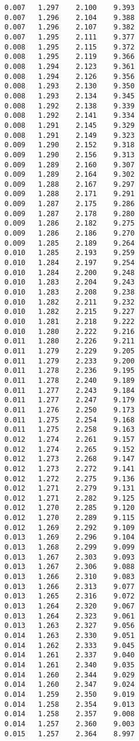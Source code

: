 \begin{verbatim}
   0.007   1.297    2.100    9.393
   0.007   1.296    2.104    9.388
   0.007   1.296    2.107    9.382
   0.007   1.295    2.111    9.377
   0.008   1.295    2.115    9.372
   0.008   1.295    2.119    9.366
   0.008   1.294    2.123    9.361
   0.008   1.294    2.126    9.356
   0.008   1.293    2.130    9.350
   0.008   1.293    2.134    9.345
   0.008   1.292    2.138    9.339
   0.008   1.292    2.141    9.334
   0.008   1.291    2.145    9.329
   0.008   1.291    2.149    9.323
   0.009   1.290    2.152    9.318
   0.009   1.290    2.156    9.313
   0.009   1.289    2.160    9.307
   0.009   1.289    2.164    9.302
   0.009   1.288    2.167    9.297
   0.009   1.288    2.171    9.291
   0.009   1.287    2.175    9.286
   0.009   1.287    2.178    9.280
   0.009   1.286    2.182    9.275
   0.009   1.286    2.186    9.270
   0.009   1.285    2.189    9.264
   0.010   1.285    2.193    9.259
   0.010   1.284    2.197    9.254
   0.010   1.284    2.200    9.248
   0.010   1.283    2.204    9.243
   0.010   1.283    2.208    9.238
   0.010   1.282    2.211    9.232
   0.010   1.282    2.215    9.227
   0.010   1.281    2.218    9.222
   0.010   1.280    2.222    9.216
   0.011   1.280    2.226    9.211
   0.011   1.279    2.229    9.205
   0.011   1.279    2.233    9.200
   0.011   1.278    2.236    9.195
   0.011   1.278    2.240    9.189
   0.011   1.277    2.243    9.184
   0.011   1.277    2.247    9.179
   0.011   1.276    2.250    9.173
   0.011   1.275    2.254    9.168
   0.011   1.275    2.258    9.163
   0.012   1.274    2.261    9.157
   0.012   1.274    2.265    9.152
   0.012   1.273    2.268    9.147
   0.012   1.273    2.272    9.141
   0.012   1.272    2.275    9.136
   0.012   1.271    2.279    9.131
   0.012   1.271    2.282    9.125
   0.012   1.270    2.285    9.120
   0.012   1.270    2.289    9.115
   0.012   1.269    2.292    9.109
   0.013   1.269    2.296    9.104
   0.013   1.268    2.299    9.099
   0.013   1.267    2.303    9.093
   0.013   1.267    2.306    9.088
   0.013   1.266    2.310    9.083
   0.013   1.266    2.313    9.077
   0.013   1.265    2.316    9.072
   0.013   1.264    2.320    9.067
   0.013   1.264    2.323    9.061
   0.013   1.263    2.327    9.056
   0.014   1.263    2.330    9.051
   0.014   1.262    2.333    9.045
   0.014   1.261    2.337    9.040
   0.014   1.261    2.340    9.035
   0.014   1.260    2.344    9.029
   0.014   1.260    2.347    9.024
   0.014   1.259    2.350    9.019
   0.014   1.258    2.354    9.013
   0.014   1.258    2.357    9.008
   0.014   1.257    2.360    9.003
   0.015   1.257    2.364    8.997

\end{verbatim}
